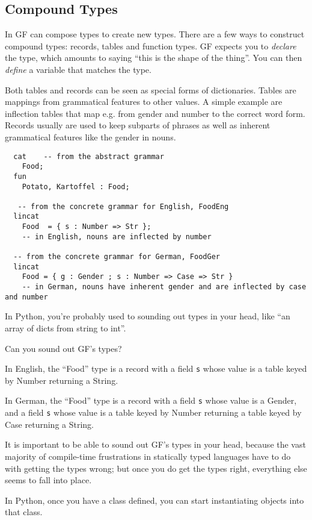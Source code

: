 \documentclass{scrartcl}
\begin{document}
\subsection{Compound Types}

In GF can compose types to create new types. There are a few ways to construct compound types: records, tables and function types. GF expects you to \emph{declare} the type, which amounts to saying ``this is the shape of the thing''. You can then \emph{define} a variable that matches the type.

Both tables and records can be seen as special forms of dictionaries. Tables are mappings from grammatical features to other values. A simple example are inflection tables that map e.g. from gender and number to the correct word form. Records usually are used to keep subparts of phrases as well as inherent grammatical features like the gender in nouns.

\begin{verbatim}
  cat    -- from the abstract grammar
    Food;
  fun
    Potato, Kartoffel : Food;

   -- from the concrete grammar for English, FoodEng
  lincat
    Food  = { s : Number => Str };
    -- in English, nouns are inflected by number

  -- from the concrete grammar for German, FoodGer
  lincat
    Food = { g : Gender ; s : Number => Case => Str }
    -- in German, nouns have inherent gender and are inflected by case and number
\end{verbatim}

In Python, you're probably used to sounding out types in your head, like ``an array of dicts from string to int''.

Can you sound out GF's types?

In English, the ``Food'' type is a record with a field \texttt{s} whose value is a table keyed by Number returning a String.

In German, the ``Food'' type is a record with a field \texttt{s} whose value is a Gender, and a field \texttt{s} whose value is a table keyed by Number returning a table keyed by Case returning a String.

It is important to be able to sound out GF's types in your head, because the vast majority of compile-time frustrations in statically typed languages have to do with getting the types wrong; but once you do get the types right, everything else seems to fall into place.

In Python, once you have a class defined, you can start instantiating objects into that class.
\end{document}
